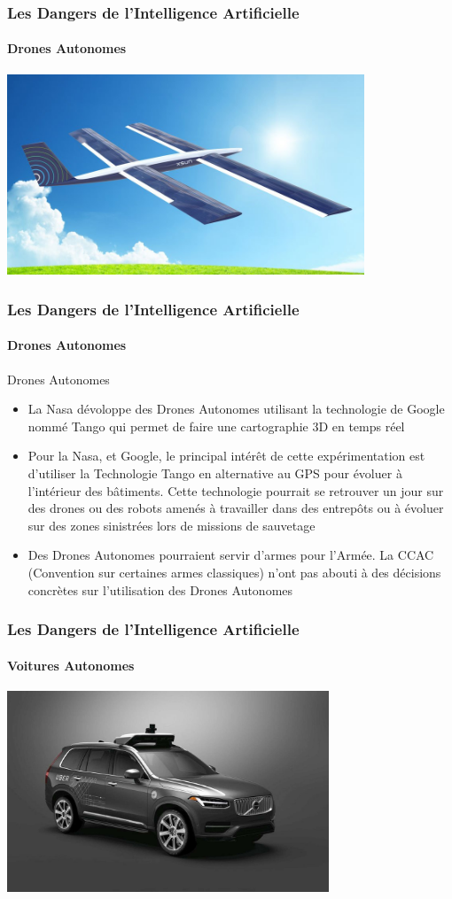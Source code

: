 \documentclass{beamer}
\begin{document}
	\begin{frame}
	\frametitle{Les Dangers de l'Intelligence Artificielle}
	\framesubtitle{Drones Autonomes}
	\centerline{\includegraphics[height=6cm]{drone.jpg}}
	\end{frame}
	
	\begin{frame}
	\frametitle{Les Dangers de l'Intelligence Artificielle}
	\framesubtitle{Drones Autonomes}
	\begin{block}{Drones Autonomes}
	\begin{itemize}
	\itemsep1em
		\item La Nasa dévoloppe des Drones Autonomes utilisant la technologie de Google nommé Tango qui permet de faire une cartographie 3D en temps réel
		\item Pour la Nasa, et Google, le principal intérêt de cette expérimentation est d'utiliser la Technologie Tango en alternative au GPS pour évoluer à l'intérieur des bâtiments. Cette technologie pourrait se retrouver un jour sur des drones ou des robots amenés à travailler dans des entrepôts ou à évoluer sur des zones sinistrées lors de missions de sauvetage
		\item Des Drones Autonomes pourraient servir d'armes pour l'Armée. La CCAC (Convention sur certaines armes classiques) n'ont pas abouti à des décisions concrètes sur l'utilisation des Drones Autonomes
	\end{itemize}
	\end{block}
	\end{frame}
	
	\begin{frame}
	\frametitle{Les Dangers de l'Intelligence Artificielle}
	\framesubtitle{Voitures Autonomes}
	\centerline{\includegraphics[height=6cm]{uber.jpg}}
	\end{frame}
	
\end{document}
